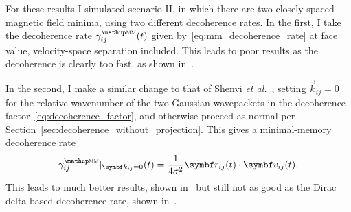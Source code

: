 For these results I simulated scenario II, in which there are two closely spaced magnetic field minima, using two different decoherence rates. In the first, I take the decoherence rate $\gamma^\up{\textsc{mm}}_{ij}(t)$ given by~\eqref{eq:mm_decoherence_rate} at face value, velocity-space separation included. This leads to poor results as the decoherence is clearly too fast, as shown in~.

In the second, I make a similar change to that of Shenvi \emph{et al.}~\cite{doi:10.1063/1.3575588}, setting $\vec k_{ij} = 0$ for the relative wavenumber of the two Gaussian wavepackets in the decoherence factor~\eqref{eq:decoherence_factor}, and otherwise proceed as normal per Section~\ref{sec:decoherence_without_projection}. This gives a minimal-memory decoherence rate
\begin{align}
\gamma^\up{\textsc{mm}}_{ij}|_{\vec k_{ij} = 0}(t) = \frac{1}{4\sigma^2}\vec r_{ij}(t)\cdot\vec v_{ij}(t).
\end{align}
This leads to much better results, shown in~ but still not as good as the Dirac delta based decoherence rate, shown in~. 

